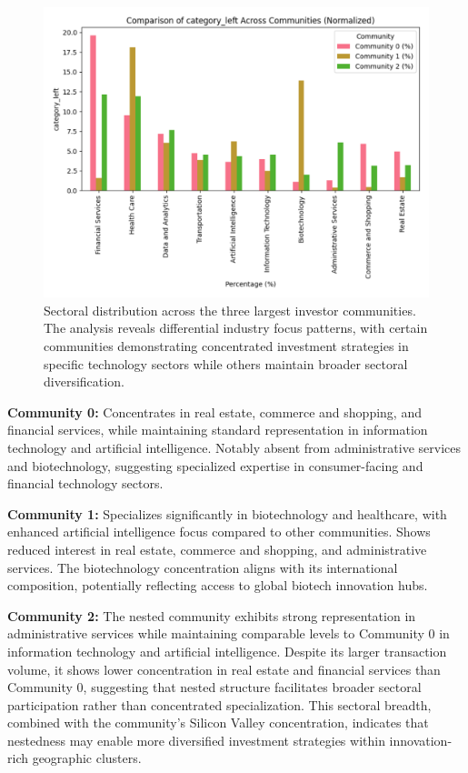\begin{figure}[htbp]
\centering
\includegraphics[width=1\textwidth]{./assets/sectorial-distribution.png}
\caption{Sectoral distribution across the three largest investor communities. The analysis reveals differential industry focus patterns, with certain communities demonstrating concentrated investment strategies in specific technology sectors while others maintain broader sectoral diversification.}
\label{fig:sectoral_distribution}
\end{figure}


\textbf{Community 0:} Concentrates in real estate, commerce and shopping, and financial services, while maintaining standard representation in information technology and artificial intelligence. Notably absent from administrative services and biotechnology, suggesting specialized expertise in consumer-facing and financial technology sectors.

\textbf{Community 1:} Specializes significantly in biotechnology and healthcare, with enhanced artificial intelligence focus compared to other communities. Shows reduced interest in real estate, commerce and shopping, and administrative services. The biotechnology concentration aligns with its international composition, potentially reflecting access to global biotech innovation hubs.

\textbf{Community 2:} The nested community exhibits strong representation in administrative services while maintaining comparable levels to Community 0 in information technology and artificial intelligence. Despite its larger transaction volume, it shows lower concentration in real estate and financial services than Community 0, suggesting that nested structure facilitates broader sectoral participation rather than concentrated specialization. This sectoral breadth, combined with the community's Silicon Valley concentration, indicates that nestedness may enable more diversified investment strategies within innovation-rich geographic clusters.


